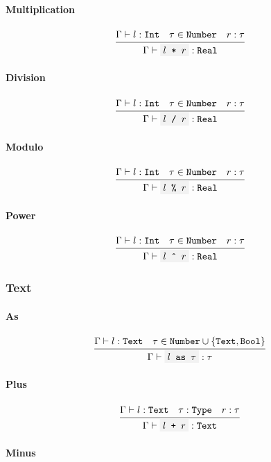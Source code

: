 \documentclass[11pt]{report}
\newcommand{\set}[1]{\left\{#1\right\}}
\newcommand{\infrule}[3][gathered]{\frac{\begin{#1}#2\end{#1}}{\begin{gathered}#3\end{gathered}}}
\newcommand{\then}{\vdash}
\newcommand{\code}[1]{\texttt{\colorbox{gray!10}{#1}}}
\newcommand{\Type}{\texttt{Type}}
\newcommand{\Bool}{\texttt{Bool}}
\newcommand{\Text}{\texttt{Text}}
\newcommand{\Int}{\texttt{Int}}
\newcommand{\Real}{\texttt{Real}}
\newcommand{\Env}{\Gamma}
\theoremstyle{definition}
\begin{document}
\paragraph{Multiplication}

\[
	\infrule{
		\Env\then l:\Int \quad \tau \in \texttt{Number} \quad r:\tau
	}{
		\Env\then \code{$l$ * $r$} : \Real
	}
\]

\paragraph{Division}

\[
	\infrule{
		\Env\then l:\Int \quad \tau \in \texttt{Number} \quad r:\tau
	}{
		\Env\then \code{$l$ / $r$} : \Real
	}
\]

\paragraph{Modulo}

\[
	\infrule{
		\Env\then l:\Int \quad \tau \in \texttt{Number} \quad r:\tau
	}{
		\Env\then \code{$l$ \% $r$} : \Real
	}
\]

\paragraph{Power}

\[
	\infrule{
		\Env\then l:\Int \quad \tau \in \texttt{Number} \quad r:\tau
	}{
		\Env\then \code{$l$ \^{} $r$} : \Real
	}
\]

\subsubsection{Text}

\paragraph{As}

\[
	\infrule{
		\Env\then l:\Text \quad \tau \in \texttt{Number} \cup \set{\Text, \Bool}
	}{
		\Env\then \code{$l$ as $\tau$}: \tau
	}
\]

\paragraph{Plus}

\[
	\infrule{
		\Env\then l:\Text \quad \tau:\Type \quad r:\tau
	}{
		\Env\then \code{$l$ + $r$}: \Text
	}
\]

\paragraph{Minus}
\end{document}
